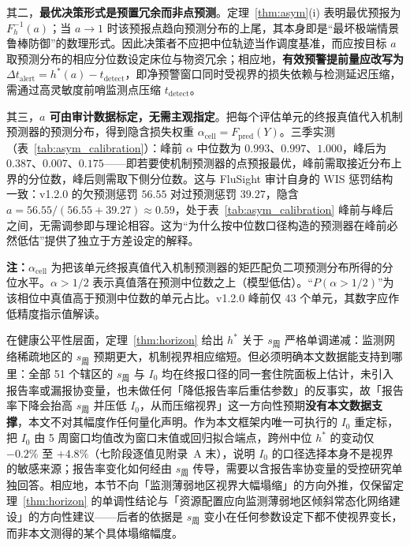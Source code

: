 \documentclass[10pt,UTF8,a4paper,zihao=-4]{ctexart}
\theoremstyle{plain}
\theoremstyle{definition}
\theoremstyle{remark}
\begin{document}
其二，\textbf{最优决策形式是预置冗余而非点预测}。定理~\ref{thm:asym}(i) 表明最优预报为 $F_h^{-1}(a)$；当 $a\to1$ 时该预报点趋向预测分布的上尾，其本身即是“最坏极端情景鲁棒防御”的数理形式。因此决策者不应把中位轨迹当作调度基准，而应按目标 $a$ 取预测分布的相应分位数设定床位与物资冗余；相应地，\textbf{有效预警提前量应改写为} $\Delta t_{\text{alert}} = h^*(a) - t_{\text{detect}}$，即净预警窗口同时受视界的损失依赖与检测延迟压缩，需通过高灵敏度前哨监测点压缩 $t_{\text{detect}}$。

其三，\textbf{$a$ 可由审计数据标定，无需主观指定}。把每个评估单元的终报真值代入机制预测器的预测分布，得到隐含损失权重 $\alpha_{\text{cell}} = F_{\text{pred}}(Y)$。三季实测（表~\ref{tab:asym_calibration}）：峰前 $\alpha$ 中位数为 $0.993$、$0.997$、$1.000$，峰后为 $0.387$、$0.007$、$0.175$——即若要使机制预测器的点预报最优，峰前需取接近分布上界的分位数，峰后则需取下侧分位数。这与 FluSight 审计自身的 WIS 惩罚结构一致：v1.2.0 的欠预测惩罚 $56.55$ 对过预测惩罚 $39.27$，隐含 $a = 56.55/(56.55+39.27) \approx 0.59$，处于表~\ref{tab:asym_calibration} 峰前与峰后之间，无需调参即与理论相容。这为“为什么按中位数口径构造的预测器在峰前必然低估”提供了独立于方差设定的解释。

\begin{table}[htbp]
\centering
\footnotesize
\setlength{\tabcolsep}{4pt}
\caption{非对称损失权重的实测标定：隐含损失权重 $\alpha_{\text{cell}} = F_{\text{pred}}(Y)$（$h=1$，严格四方交集）}
\label{tab:asym_calibration}

\vspace{2pt}
\begin{flushleft}
\scriptsize \textbf{注：}$\alpha_{\text{cell}}$ 为把该单元终报真值代入机制预测器的矩匹配负二项预测分布所得的分位水平。$\alpha > 1/2$ 表示真值落在预测中位数之上（模型低估）。“$P(\alpha>1/2)$”为该相位中真值高于预测中位数的单元占比。v1.2.0 峰前仅 43 个单元，其数字应作低精度指示值解读。
\end{flushleft}
\end{table}

在健康公平性层面，定理~\ref{thm:horizon} 给出 $h^*$ 关于 $s_{\text{周}}$ 严格单调递减：监测网络稀疏地区的 $s_{\text{周}}$ 预期更大，机制视界相应缩短。但必须明确本文数据能支持到哪里：全部 51 个辖区的 $s_{\text{周}}$ 与 $I_0$ 均在终报口径的同一套住院面板上估计，未引入报告率或漏报协变量，也未做任何「降低报告率后重估参数」的反事实，故「报告率下降会抬高 $s_{\text{周}}$ 并压低 $I_0$，从而压缩视界」这一方向性预期\textbf{没有本文数据支撑}，本文不对其幅度作任何量化声明。作为本文框架内唯一可执行的 $I_0$ 重定标，把 $I_0$ 由 5 周窗口均值改为窗口末值或回归拟合端点，跨州中位 $h^*$ 的变动仅 $-0.2\%$ 至 $+4.8\%$（七阶段逐值见附录~A 末），说明 $I_0$ 的口径选择本身不是视界的敏感来源；报告率变化如何经由 $s_{\text{周}}$ 传导，需要以含报告率协变量的受控研究单独回答。相应地，本节不向「监测薄弱地区视界大幅塌缩」的方向外推，仅保留定理~\ref{thm:horizon} 的单调性结论与「资源配置应向监测薄弱地区倾斜常态化网络建设」的方向性建议——后者的依据是 $s_{\text{周}}$ 变小在任何参数设定下都不使视界变长，而非本文测得的某个具体塌缩幅度。
\end{document}
